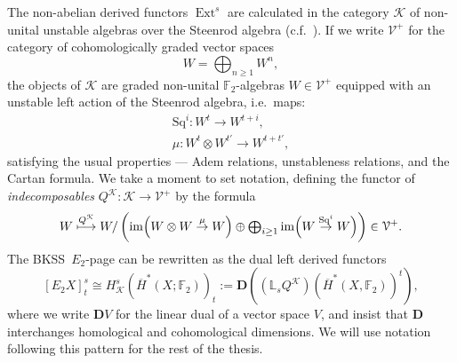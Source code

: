 \documentclass[11pt]{amsart} \renewcommand{\baselinestretch}{1.2}
\theoremstyle{plain}
\numberwithin{equation}{section} %
\theoremstyle{plain}
\numberwithin{equation}{chapter} %
\DeclareMathOperator{\Ext}{Ext}
\DeclareMathOperator{\im}{im}
\renewcommand{\to}{\longrightarrow}
\newcommand{\calV}{\mathcal{V}}
\newcommand{\cala}{\mathcal{A}}
\newcommand{\calk}{\mathcal{K}}
\newcommand{\calc}{\mathcal{C}}
\newcommand{\citeBOX}[2][]{\cite[\mbox{#1}]{#2}}
\newcommand{\vect}[2]{\calV^{#1}_{#2}}
\newcommand{\Sq}{\mathrm{Sq}}
\newcommand{\F}{\mathbb{F}}
\newcommand{\Ftwo}{\F_2}
\newcommand{\E}[5]{[E^{#1}_{#2}#3]^{#4}_{#5}}
\newcommand{\dual}{\mathbf{D}}
\renewcommand{\mapsto}{\longmapsto}
\newcommand{\BKSS}{BKSS}
\begin{document}
\begin{Introduction}
The non-abelian derived functors $\Ext^s$ are calculated in the category 
%
$\calk$ of non-unital unstable algebras over the Steenrod algebra  (c.f.\  \citeBOX[\S1.4]{MR1282727}). If we write $\vect{+}{}$ for the category of cohomologically graded vector spaces \[W=\textstyle \bigoplus_{n\geq 1} W^n,\] the objects of $\calk$ are graded non-unital $\Ftwo$-algebras
$W\in\vect{+}{}$
equipped with an unstable left action of the Steenrod algebra, i.e.\ maps:
\begin{gather*}
\Sq^i: W^t\to W^{t+i},\\
\mu: W^t\otimes W^{t'}\to W^{t+t'},
\end{gather*}
satisfying the usual properties --- Adem relations, unstableness relations, and the Cartan formula.
We take a moment to set notation, defining the functor of \emph{indecomposables} 
$Q^{\calk}:\calk\to \vect{+}{}$
by the formula
\[W\overset{Q^{\calk}}{\mapsto}W/\left(\im\Bigl(W\otimes W\overset{\mu}{\rightarrow} W\Bigr)\oplus\textstyle\bigoplus_{i\geq1}\im\Bigl(W\overset{\Sq^i}{\rightarrow} W\Bigr)\right)\in\vect{+}{}.\]
The \BKSS\ $E_2$-page can be  rewritten as the dual left derived functors
\[\E{}{2}{X}{s}{t}\cong H^s_{\calk}(\overline{H}^*(X;\Ftwo))_t:=\dual((\mathbb{L}_sQ^{\calk})(\overline{H}^*(X,\Ftwo) )^t),\]
where we write  $\dual V$ for the linear dual of a vector space $V$, and insist that $\dual$ interchanges homological and cohomological dimensions. We will use notation following this pattern for the rest of the thesis.




\end{Introduction}
\end{document}
